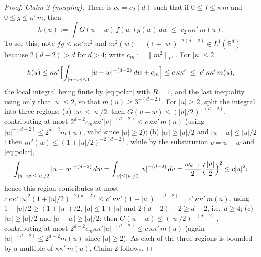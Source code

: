 \documentclass[10pt,a4paper]{amsart}
\newcommand{\R}{\mathbb{R}}
\begin{document}
\begin{proof}
\emph{Claim 2 (merging).} There is $c_2=c_2(d)$ such that if
$0\le f\le\kappa\,m$ and $0\le g\le\kappa'\,m$, then
\[
h(u):=\int\bar G(u-w)\,f(w)g(w)\,dw\;\le\;c_2\,\kappa\kappa'\,m(u).
\]
To see this, note $fg\le\kappa\kappa' m^2$ and
$m^2(w)=(1+|w|)^{-2(d-2)}\in L^1(\R^d)$ because $2(d-2)>d$ for $d>4$; write
$c_m:=\|m^2\|_{L^1}$. For $|u|\le2$,
\[
h(u)\le\kappa\kappa'\Bigl[\int_{|u-w|\le1}|u-w|^{-(d-2)}\,dw
+c_m\Bigr]\le c\,\kappa\kappa'\;\le\;c'\,\kappa\kappa'\,m(u),
\]
the local integral being finite by \eqref{eq:polar} with $R=1$, and the last inequality using only that $|u|\le2$, so that $m(u)\ge3^{-(d-2)}$.
For $|u|\ge2$, split the integral into three regions:
(a) $|w|\le|u|/2$: then $\bar G(u-w)\le(|u|/2)^{-(d-2)}$, contributing
at most $2^{d-2}c_m\kappa\kappa'|u|^{-(d-2)}\le c\,\kappa\kappa'\,m(u)$ (using $|u|^{-(d-2)}\le2^{d-2}m(u)$, valid since $|u|\ge2$);
(b) $|w|\ge|u|/2$ and $|u-w|\le|u|/2$: then
$m^2(w)\le(1+|u|/2)^{-2(d-2)}$, while by the substitution $v=u-w$ and
\eqref{eq:polar},
\[
\int_{|u-w|\le|u|/2}|u-w|^{-(d-2)}\,dw
=\int_{|v|\le|u|/2}|v|^{-(d-2)}\,dv=\frac{\omega_{d-1}}{2}\Bigl(\frac{|u|}{2}\Bigr)^2
\le c|u|^2;
\]
hence this region contributes at most
$c\,\kappa\kappa'\,|u|^{2}(1+|u|/2)^{-2(d-2)}
\le c'\,\kappa\kappa'(1+|u|)^{-(d-2)}=c'\,\kappa\kappa'\,m(u)$, using $1+|u|/2\ge(1+|u|)/2$,
$|u|\le1+|u|$ and $2(d-2)-2\ge d-2$, i.e.\
$d\ge4$;
(c) $|w|\ge|u|/2$ and $|u-w|\ge|u|/2$: then
$\bar G(u-w)\le(|u|/2)^{-(d-2)}$, contributing at most
$2^{d-2}c_m\kappa\kappa'|u|^{-(d-2)}\le c\,\kappa\kappa'\,m(u)$ (again $|u|^{-(d-2)}\le2^{d-2}m(u)$ since $|u|\ge2$). As each of the three regions is bounded by a multiple of $\kappa\kappa'\,m(u)$, Claim 2 follows.


\end{proof}
\end{document}
